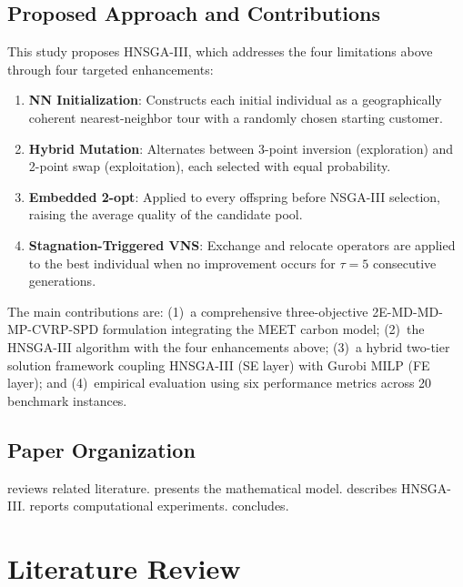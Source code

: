\documentclass[11pt, a4paper]{article}
\numberwithin{equation}{section}
\begin{document}
\subsection{Proposed Approach and Contributions}

This study proposes HNSGA-III, which addresses the four limitations above
through four targeted enhancements:
\begin{enumerate}
  \item \textbf{NN Initialization}: Constructs each initial individual as a
        geographically coherent nearest-neighbor tour with a randomly chosen
        starting customer.
  \item \textbf{Hybrid Mutation}: Alternates between 3-point inversion
        (exploration) and 2-point swap (exploitation), each selected with
        equal probability.
  \item \textbf{Embedded 2-opt}: Applied to every offspring before NSGA-III
        selection, raising the average quality of the candidate pool.
  \item \textbf{Stagnation-Triggered VNS}: Exchange and relocate operators
        are applied to the best individual when no improvement occurs for
        $\tau=5$ consecutive generations.
\end{enumerate}

The main contributions are: (1)~a comprehensive three-objective
2E-MD-MD-MP-CVRP-SPD formulation integrating the MEET carbon model;
(2)~the HNSGA-III algorithm with the four enhancements above; (3)~a hybrid
two-tier solution framework coupling HNSGA-III (SE layer) with Gurobi MILP
(FE layer); and (4)~empirical evaluation using six performance metrics across
20 benchmark instances.

\subsection{Paper Organization}

 reviews related literature.   presents the
mathematical model.   describes HNSGA-III\@.  
reports computational experiments.   concludes.

\section{Literature Review}
\label{sec:lit}
\end{document}
